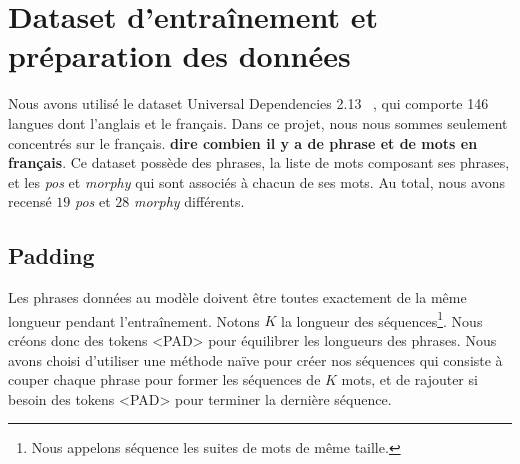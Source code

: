 \documentclass[a4paper]{article}
\begin{document}







\section{Dataset d'entraînement et préparation des données}

Nous avons utilisé le dataset Universal Dependencies 2.13 ~\cite{11234/1-5287}, qui comporte 146 langues dont l'anglais
et le français. Dans ce projet, nous nous sommes seulement concentrés sur le français.
\textbf{dire combien il y a de phrase et de mots en français}. Ce dataset possède des phrases, la liste de mots composant ses phrases,
et les \textit{pos} et \textit{morphy} qui sont associés à chacun de ses mots. Au total, nous avons recensé $19$ \textit{pos} et $28$ \textit{morphy} différents.

\subsection{Padding}

Les phrases données au modèle doivent être toutes exactement de la même longueur pendant l'entraînement. 
Notons $K$ la longueur des séquences\footnote{Nous appelons séquence les suites de mots de même taille.}. Nous créons donc des tokens <PAD> pour équilibrer les longueurs des phrases.
Nous avons choisi d'utiliser une méthode naïve pour créer nos séquences qui consiste à couper chaque phrase pour former les séquences
de $K$ mots, et de rajouter si besoin des tokens <PAD> pour terminer la dernière séquence.
\end{document}
